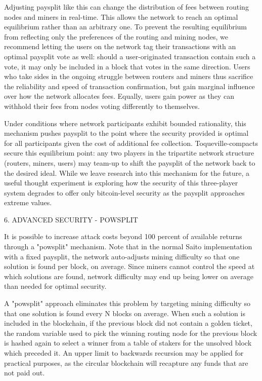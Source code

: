 \documentclass[11pt, oneside]{article}   	%
\begin{document}
\begin{multicols}{2}
Adjusting paysplit like this can change the distribution of fees between routing nodes and miners in real-time. This allows the network to reach an optimal equilibrium rather than an arbitrary one. To prevent the resulting equilibrium from reflecting only the preferences of the routing and mining nodes, we recommend letting the users on the network tag their transactions with an optimal paysplit vote as well: should a user-originated transaction contain such a vote, it may only be included in a block that votes in the same direction. Users who take sides in the ongoing struggle between routers and miners thus sacrifice the reliability and speed of transaction confirmation, but gain marginal influence over how the network allocates fees. Equally, users gain power as they can withhold their fees from nodes voting differently to themselves.

Under conditions where network participants exhibit bounded rationality, this mechanism pushes paysplit to the point where the security provided is optimal for all participants given the cost of additional fee collection. Toqueville-compacts secure this equilibrium point: any two players in the tripartite network structure (routers, miners, users) may team-up to shift the paysplit of the network back to the desired ideal. While we leave research into this mechanism for the future, a useful thought experiment is exploring how the security of this three-player system degrades to offer only bitcoin-level security as the paysplit approaches extreme values.


6. ADVANCED SECURITY - POWSPLIT

It is possible to increase attack costs beyond 100 percent of available returns through a "powsplit" mechanism. Note that in the normal Saito implementation with a fixed paysplit, the network auto-adjusts mining difficulty so that one solution is found per block, on average. Since miners cannot control the speed at which solutions are found, network difficulty may end up being lower on average than needed for optimal security.

A "powsplit" approach eliminates this problem by targeting mining difficulty so that one solution is found every N blocks on average. When such a solution is included in the blockchain, if the previous block did not contain a golden ticket, the random variable used to pick the winning routing node for the previous block is hashed again to select a winner from a table of stakers for the unsolved block which preceded it. An upper limit to backwards recursion may be applied for practical purposes, as the circular blockchain will recapture any funds that are not paid out.


\end{multicols}
\end{document}
